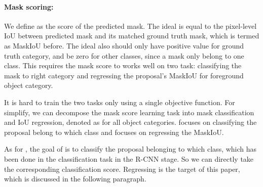 \documentclass[10pt,twocolumn,letterpaper]{article}
\begin{document}
\vspace{-2mm}  
    \paragraph{Mask scoring:} 


    We define  as the score of the predicted mask. The ideal  is equal to the pixel-level IoU between predicted mask and its matched ground truth mask, which is termed as MaskIoU before. The ideal  also should only have positive value for ground truth category, and be zero for other classes, since a mask only belong to one class. This requires the mask score to works well on two task: classifying the mask to right category and regressing the proposal's MaskIoU for foreground object category.
    
    It is hard to train the two tasks only using a single objective function. For simplify, we can decompose the mask score learning task into mask classification and IoU regression, denoted as  for all object categories.  focuses on classifying the proposal belong to which class and  focuses on regressing the MaskIoU. 
    
    
    As for , the goal of  is to classify the proposal belonging to which class, which has been done in the classification task in the R-CNN stage. So we can directly take the corresponding classification score.  
    Regressing  is the target of this paper, which is discussed in the following paragraph.
    









    
  
    
\end{document}
